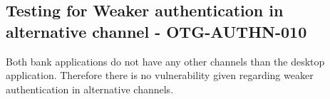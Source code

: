 \subsection{Testing for Weaker authentication in alternative channel - OTG-AUTHN-010}
Both bank applications do not have any other channels than the desktop application. Therefore there is no vulnerability given regarding weaker authentication in alternative channels.
\clearpage